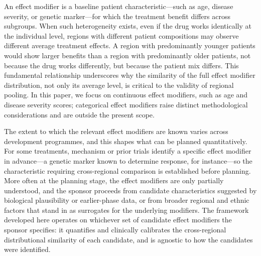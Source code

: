 \documentclass[AMA,Times1COL]{WileyNJDv5}
\begin{document}
An effect modifier is a baseline patient characteristic---such as age, disease severity, or genetic marker---for which the treatment benefit differs across subgroups. When such heterogeneity exists, even if the drug works identically at the individual level, regions with different patient compositions may observe different average treatment effects. A region with predominantly younger patients would show larger benefits than a region with predominantly older patients, not because the drug works differently, but because the patient mix differs. This fundamental relationship underscores why the similarity of the full effect modifier distribution, not only its average level, is critical to the validity of regional pooling. In this paper, we focus on continuous effect modifiers, such as age and disease severity scores; categorical effect modifiers raise distinct methodological considerations and are outside the present scope.

The extent to which the relevant effect modifiers are known varies across development programmes, and this shapes what can be planned quantitatively.\cite{komiyama2024} For some treatments, mechanism or prior trials identify a specific effect modifier in advance---a genetic marker known to determine response, for instance---so the characteristic requiring cross-regional comparison is established before planning. More often at the planning stage, the effect modifiers are only partially understood, and the sponsor proceeds from candidate characteristics suggested by biological plausibility or earlier-phase data, or from broader regional and ethnic factors that stand in as surrogates for the underlying modifiers.\cite{komiyama2024} The framework developed here operates on whichever set of candidate effect modifiers the sponsor specifies: it quantifies and clinically calibrates the cross-regional distributional similarity of each candidate, and is agnostic to how the candidates were identified.
\end{document}
